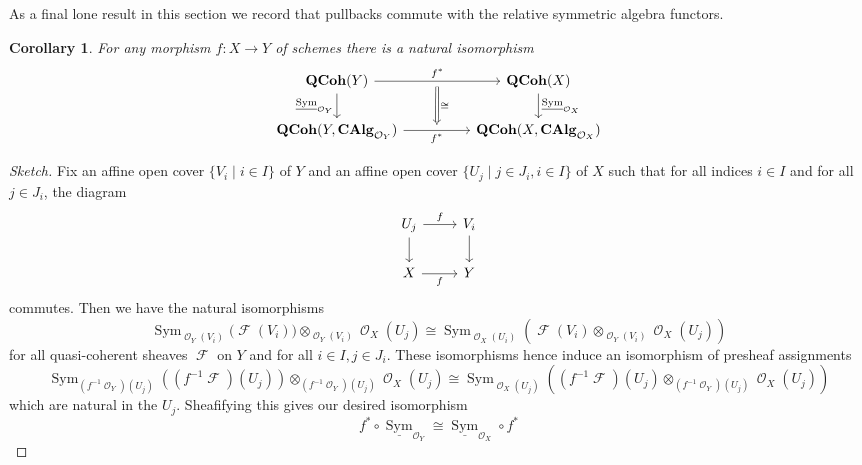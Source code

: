 \documentclass{amsart}
\newtheorem{corollary}[equation]{Corollary}
\theoremstyle{definition}
\DeclareMathOperator{\Fscr}{\mathscr{F}}
\DeclareMathOperator{\Ocal}{\mathcal{O}}
\DeclareMathOperator{\sym}{Sym}
\newcommand{\CAlg}[1]{\mathbf{CAlg}_{#1}}
\newcommand{\Sym}[1]{\sym_{#1}}
\newcommand{\RelSym}[1]{\underline{\sym}_{{#1}}}
\DeclareMathOperator{\QCoh}{\mathbf{QCoh}}
\numberwithin{equation}{subsection}
\begin{document}

As a final lone result in this section we record that pullbacks commute with the relative symmetric algebra functors. 

\begin{corollary}\label{Cor: Section Background Scheme: The pullback Sym isos for qcoh}
For any morphism $f:X \to Y$ of schemes there is a natural isomorphism
\[
\begin{tikzcd}
\QCoh(Y) \ar[rr, ""{name = U}]{}{f^{\ast}} \ar[d, swap]{}{\RelSym{\Ocal_Y}} & & \QCoh(X) \ar[d]{}{\RelSym{\Ocal_X}} \\
\QCoh(Y,\CAlg{\Ocal_Y}) \ar[rr, swap, ""{name = D}]{}{f^{\ast}} & & \QCoh(X,\CAlg{\Ocal_X})
\ar[from = U, to = D, Rightarrow, shorten <= 4pt, shorten >= 4pt]{}{\cong}
\end{tikzcd}
\]
\end{corollary}
\begin{proof}[Sketch]
Fix an affine open cover $\lbrace V_i \; | \; i \in I \rbrace$ of $Y$ and an affine open cover $\lbrace U_j \; | \; j \in J_i, i \in I \rbrace$ of $X$ such that for all indices $i \in I$ and for all $j \in J_i$, the diagram
\[
\begin{tikzcd}
U_j \ar[d, swap] \ar[r]{}{f} & V_i \ar[d] \\
X \ar[r, swap]{}{f} & Y
\end{tikzcd}
\]
commutes. Then we have the natural isomorphisms
\[
\Sym{\Ocal_Y(V_i)}\big(\Fscr(V_i)\big) \otimes_{\Ocal_Y(V_i)} \Ocal_X(U_j) \cong \Sym{\Ocal_X(U_i)}\left(\Fscr(V_i) \otimes_{\Ocal_Y(V_i)} \Ocal_X(U_j)\right)
\]
for all quasi-coherent sheaves $\Fscr$ on $Y$ and for all $i \in I, j \in J_i$. These isomorphisms hence induce an isomorphism of presheaf assignments
\[
\Sym{(f^{-1}\Ocal_Y)(U_j)}\left((f^{-1}\Fscr)(U_j)\right) \otimes_{(f^{-1}\Ocal_Y)(U_j)} \Ocal_X(U_j) \cong \Sym{\Ocal_X(U_j)}\left((f^{-1}\Fscr)(U_j) \otimes_{(f^{-1}\Ocal_Y)(U_j)} \Ocal_X(U_j)\right)
\]
which are natural in the $U_j$. Sheafifying this gives our desired isomorphism
\[
f^{\ast} \circ \RelSym{\Ocal_Y} \cong \RelSym{\Ocal_X} \circ f^{\ast}
\]
\end{proof}
\end{document}
